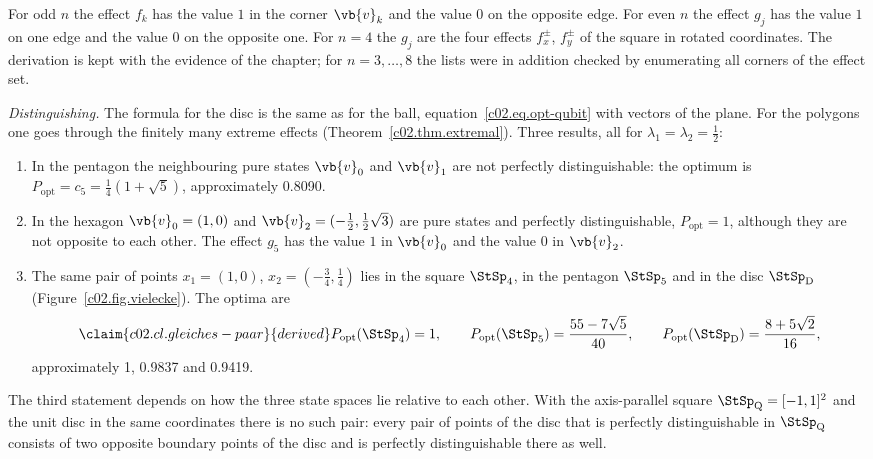 \begin{vertiefung}
  For odd $n$ the effect $f_k$ has the value $1$ in the corner $\vb{v}_k$ and the value $0$
  on the opposite edge. For even $n$ the effect $g_j$ has the value $1$ on one edge and the
  value $0$ on the opposite one. For $n = 4$ the $g_j$ are the four effects $f_x^{\pm}$,
  $f_y^{\pm}$ of the square in rotated coordinates. The derivation is kept with the
  evidence of the chapter; for $n = 3, \dots, 8$ the lists were in addition checked by
  enumerating all corners of the effect set.

  \emph{Distinguishing.} The formula for the disc is the same as for the ball,
  equation~\eqref{c02.eq.opt-qubit} with vectors of the plane. For the polygons one goes
  through the finitely many extreme effects (Theorem~\ref{c02.thm.extremal}). Three
  results, all for $\lambda_1 = \lambda_2 = \tfrac12$:
  \begin{enumerate}
    \item In the pentagon the neighbouring pure states $\vb{v}_0$ and $\vb{v}_1$ are not
      perfectly distinguishable: the optimum is
      $P_{\mathrm{opt}} = c_5 = \tfrac14(1 + \sqrt{5})$, approximately
      \num[c02.cl.level-p1]{0.8090}{}.
    \item In the hexagon $\vb{v}_0 = (1,0)$ and
      $\vb{v}_2 = (-\tfrac12, \tfrac12\sqrt{3})$ are pure states and perfectly
      distinguishable, $P_{\mathrm{opt}} = \num[c02.cl.level-h1]{1}{}$, although they are
      not opposite to each other. The effect $g_5$ has the value $1$ in $\vb{v}_0$ and the
      value $0$ in $\vb{v}_2$.
    \item The same pair of points $x_1 = (1,0)$, $x_2 = (-\tfrac34, \tfrac14)$ lies in the
      square $\StSp_4$, in the pentagon $\StSp_5$ and in the disc $\StSp_{\mathrm{D}}$
      (Figure~\ref{c02.fig.vielecke}). The optima are
      \begin{equation}\label{c02.eq.gleiches-paar}\claim{c02.cl.gleiches-paar}{derived}
        P_{\mathrm{opt}}(\StSp_4) = 1, \qquad
        P_{\mathrm{opt}}(\StSp_5) = \frac{55 - 7\sqrt{5}}{40}, \qquad
        P_{\mathrm{opt}}(\StSp_{\mathrm{D}}) = \frac{8 + 5\sqrt{2}}{16} ,
      \end{equation}
      approximately \num[c02.cl.level-c1]{1}{}, \num[c02.cl.level-c2]{0.9837}{} and
      \num[c02.cl.level-c3]{0.9419}{}.
  \end{enumerate}
  The third statement depends on how the three state spaces lie relative to each other.
  With the axis-parallel square $\StSp_{\mathrm{Q}} = [-1,1]^2$ and the unit disc in the
  same coordinates there is no such pair: every pair of points of the disc that is
  perfectly distinguishable in $\StSp_{\mathrm{Q}}$ consists of two opposite boundary
  points of the disc and is perfectly distinguishable there as well.


\end{vertiefung}
